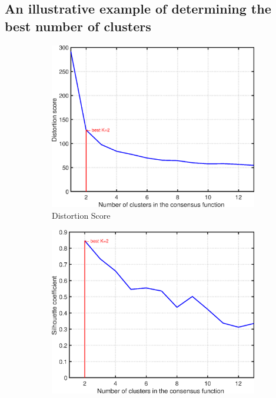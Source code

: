 \documentclass[10pt]{acmtrans2e}
\begin{document}
\subsection{An illustrative example of determining the best number of clusters}\label{subsec:example2}
\begin{figure}[!bt]
\centering
\begin{subfigure}[t]{0.32\textwidth}
  \includegraphics[width=\textwidth]{fig/iris_u_c_std_evacluster_distortionscore.eps}
  \caption{Distortion Score}
  \label{fig:iris_distortionscore}
\end{subfigure}%
\hspace*{1mm}
\begin{subfigure}[t]{0.32\textwidth}
  \includegraphics[width=\textwidth]{fig/iris_u_c_std_evacluster_silhouettecoefficient.eps}

\end{subfigure}
\end{figure}
\end{document}
